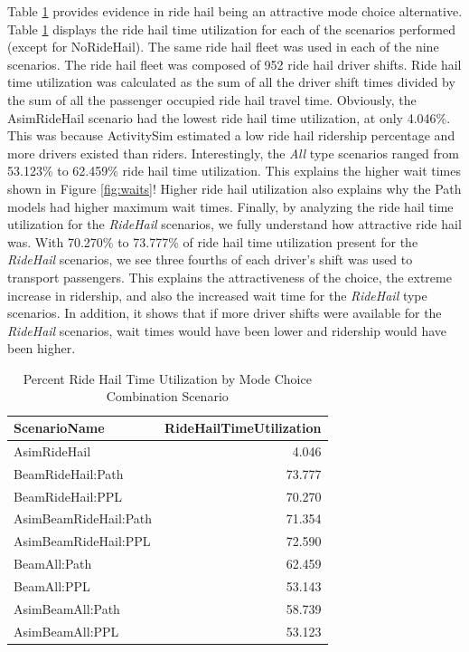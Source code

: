 \documentclass[12pt, oneside, openright]{byuthesis}
\begin{document}
Table \ref{tab:timeutil} provides evidence in ride hail being an attractive mode choice alternative. Table \ref{tab:timeutil} displays the ride hail time utilization for each of the scenarios performed (except for NoRideHail). The same ride hail fleet was used in each of the nine scenarios. The ride hail fleet was composed of 952 ride hail driver shifts. Ride hail time utilization was calculated as the sum of all the driver shift times divided by the sum of all the passenger occupied ride hail travel time. Obviously, the AsimRideHail scenario had the lowest ride hail time utilization, at only 4.046\%. This was because ActivitySim estimated a low ride hail ridership percentage and more drivers existed than riders. Interestingly, the \emph{All} type scenarios ranged from 53.123\% to 62.459\% ride hail time utilization. This explains the higher wait times shown in Figure \ref{fig:waits}! Higher ride hail utilization also explains why the Path models had higher maximum wait times. Finally, by analyzing the ride hail time utilization for the \emph{RideHail} scenarios, we fully understand how attractive ride hail was. With 70.270\% to 73.777\% of ride hail time utilization present for the \emph{RideHail} scenarios, we see three fourths of each driver's shift was used to transport passengers. This explains the attractiveness of the choice, the extreme increase in ridership, and also the increased wait time for the \emph{RideHail} type scenarios. In addition, it shows that if more driver shifts were available for the \emph{RideHail} scenarios, wait times would have been lower and ridership would have been higher.

\begin{table}

\caption{\label{tab:timeutil}Percent Ride Hail Time Utilization by Mode Choice Combination Scenario}
\centering
\begin{tabular}[t]{lr}
\toprule
ScenarioName & RideHailTimeUtilization\\
\midrule
AsimRideHail & 4.046\\
BeamRideHail:Path & 73.777\\
BeamRideHail:PPL & 70.270\\
AsimBeamRideHail:Path & 71.354\\
AsimBeamRideHail:PPL & 72.590\\
\addlinespace
BeamAll:Path & 62.459\\
BeamAll:PPL & 53.143\\
AsimBeamAll:Path & 58.739\\
AsimBeamAll:PPL & 53.123\\
\bottomrule
\end{tabular}
\end{table}
\end{document}
